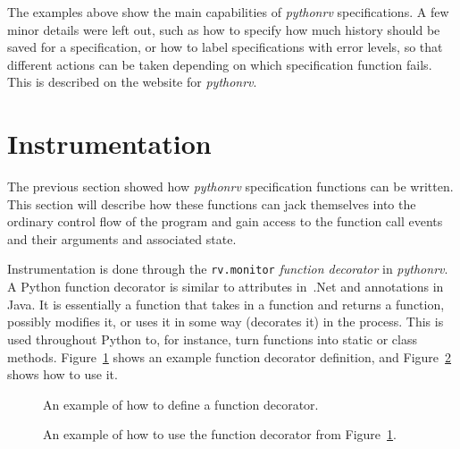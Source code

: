 \documentclass[a4paper,11pt]{kth-mag}
\begin{document}
The examples above show the main capabilities of \textit{pythonrv}
specifications. A few minor details were left out, such as how to specify how
much history should be saved for a specification, or how to label
specifications with error levels, so that different actions can be taken
depending on which specification function fails. This is described on the website for
\textit{pythonrv}.


\section{Instrumentation} \label{section-approach-instrumentation}

The previous section showed how \textit{pythonrv} specification functions can
be written. This section will describe how these functions can jack themselves
into the ordinary control flow of the program and gain access to the function
call events and their arguments and associated state.

Instrumentation is done through the \texttt{rv.monitor} \textit{function
decorator} in \textit{pythonrv}. A Python function decorator is similar to
attributes in~.Net and annotations in Java. It is essentially a function that
takes in a function and returns a function, possibly modifies it, or uses it in
some way (decorates it) in the process. This is used throughout Python to, for
instance, turn functions into static or class methods.
Figure~\ref{figure-function-decorator} shows an example function decorator
definition, and Figure~\ref{figure-function-decorator-usages} shows how to use
it.

\begin{figure}[h!]
	\begin{center}
	\begin{minipage}{0.7\textwidth}
	
	\end{minipage}
	\end{center}

	\caption{An example of how to define a function decorator.}
	\label{figure-function-decorator}
\end{figure}

\begin{figure}[h!]
	\begin{center}
	\begin{minipage}{0.7\textwidth}
	
	\end{minipage}
	\end{center}

	\caption{An example of how to use the function decorator from
	Figure~\ref{figure-function-decorator}.}
	\label{figure-function-decorator-usages}
\end{figure}
\end{document}
